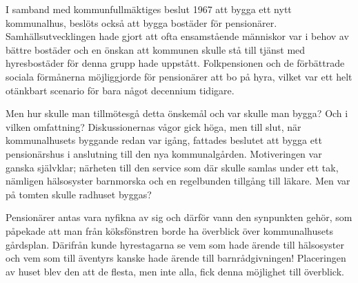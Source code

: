 


I samband med kommunfullmäktiges beslut 1967 att bygga ett nytt kommunalhus, beslöts också att bygga bostäder för pensionärer. Samhällsutvecklingen hade gjort att ofta ensamstående människor var i behov av bättre bostäder och en önskan att kommunen skulle stå till tjänst med hyresbostäder för denna grupp hade uppstått. Folkpensionen och de förbättrade sociala förmånerna möjliggjorde för pensionärer att bo på hyra, vilket var ett helt otänkbart scenario för bara något decennium tidigare.

Men hur skulle man tillmötesgå detta önskemål och var skulle man bygga? Och i vilken omfattning? Diskussionernas vågor gick höga, men till slut, när kommunalhusets byggande redan var igång, fattades beslutet att bygga ett pensionärshus i anslutning till den nya kommunalgården. Motiveringen var ganska självklar; närheten till den service som där skulle samlas under ett tak, nämligen hälsosyster barnmorska och en regelbunden tillgång till läkare. Men var på tomten skulle radhuset byggas?

Pensionärer antas vara nyfikna av sig och därför vann den synpunkten gehör, som påpekade att man från köksfönstren borde ha överblick över kommunalhusets gårdsplan. Därifrån kunde hyrestagarna se vem som hade ärende till hälsosyster och vem som till äventyrs kanske hade ärende till barnrådgivningen! Placeringen av huset blev den att de flesta, men inte alla, fick denna möjlighet till överblick.

